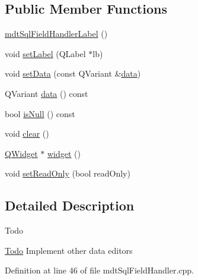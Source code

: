 \subsection*{Public Member Functions}
\begin{DoxyCompactItemize}
\item 
\hyperlink{classmdt_sql_field_handler_label_a2932d5fc753811990db80ee00dcf449e}{mdt\-Sql\-Field\-Handler\-Label} ()
\item 
void \hyperlink{classmdt_sql_field_handler_label_aa7a299bf3a0ceabc07fccbe315c0324f}{set\-Label} (Q\-Label $\ast$lb)
\item 
void \hyperlink{classmdt_sql_field_handler_label_aec2da7423e83744cb0e7e9bbd64a2c8c}{set\-Data} (const Q\-Variant \&\hyperlink{classmdt_sql_field_handler_label_a844761927071cfe1567028f950abc028}{data})
\item 
Q\-Variant \hyperlink{classmdt_sql_field_handler_label_a844761927071cfe1567028f950abc028}{data} () const 
\item 
bool \hyperlink{classmdt_sql_field_handler_label_a84ab11e4fb30612f7bf1fb04939f007c}{is\-Null} () const 
\item 
void \hyperlink{classmdt_sql_field_handler_label_a403109863b7ad3828a7e38bfc8414e34}{clear} ()
\item 
\hyperlink{class_q_widget}{Q\-Widget} $\ast$ \hyperlink{classmdt_sql_field_handler_label_a53007a4daf4e52a4f4ecd2e59318e0e7}{widget} ()
\item 
void \hyperlink{classmdt_sql_field_handler_label_a20bb295db1a447183fcf9831c3210593}{set\-Read\-Only} (bool read\-Only)
\end{DoxyCompactItemize}


\subsection{Detailed Description}
\begin{DoxyRefDesc}{Todo}
\item[\hyperlink{todo__todo000078}{Todo}]Implement other data editors \end{DoxyRefDesc}


Definition at line 46 of file mdt\-Sql\-Field\-Handler.\-cpp.



